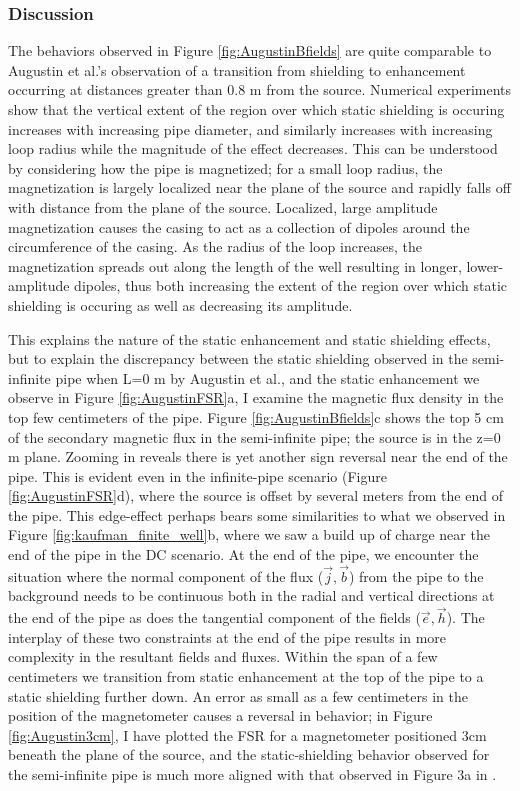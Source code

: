 \subsubsection{Discussion}
The behaviors observed in Figure \ref{fig:AugustinBfields} are quite comparable to Augustin et al.'s observation of a transition from shielding to enhancement occurring at distances greater than 0.8 m from the source. Numerical experiments show that the vertical extent of the region over which static shielding is occuring increases with increasing pipe diameter, and similarly increases with increasing loop radius while the magnitude of the effect decreases. This can be understood by considering how the pipe is magnetized; for a small loop radius, the magnetization is largely localized near the plane of the source and rapidly falls off with distance from the plane of the source. Localized, large amplitude magnetization causes the casing to act as a collection of dipoles around the circumference of the casing. As the radius of the loop increases, the magnetization spreads out along the length of the well resulting in longer, lower-amplitude dipoles, thus both increasing the extent of the region over which static shielding is occuring as well as decreasing its amplitude.




This explains the nature of the static enhancement and static shielding effects, but to explain the discrepancy between the static shielding observed in the semi-infinite pipe when L=0 m by Augustin et al., and the static enhancement we observe in Figure \ref{fig:AugustinFSR}a, I examine the magnetic flux density in the top few centimeters of the pipe. Figure \ref{fig:AugustinBfields}c shows the top 5 cm of the secondary magnetic flux in the semi-infinite pipe; the source is in the z=0 m plane.  Zooming in reveals there is yet another sign reversal near the end of the pipe. This is evident even in the infinite-pipe scenario (Figure \ref{fig:AugustinFSR}d), where the source is offset by several meters from the end of the pipe. This edge-effect perhaps bears some similarities to what we observed in Figure \ref{fig:kaufman_finite_well}b, where we saw a build up of charge near the end of the pipe in the DC scenario. At the end of the pipe, we encounter the situation where the normal component of the flux ($\vec{j}, \vec{b}$) from the pipe to the background needs to be continuous both in the radial and vertical directions at the end of the pipe as does the tangential component of the fields ($\vec{e}, \vec{h}$). The interplay of these two constraints at the end of the pipe results in more complexity in the resultant fields and fluxes. Within the span of a few centimeters we transition from static enhancement at the top of the pipe to a static shielding further down. An error as small as a few centimeters in the position of the magnetometer causes a reversal in behavior; in Figure \ref{fig:Augustin3cm}, I have plotted the FSR for a magnetometer positioned 3cm beneath the plane of the source, and the static-shielding behavior observed for the semi-infinite pipe is much more aligned with that observed in Figure 3a in \cite{Augustin1989}.



